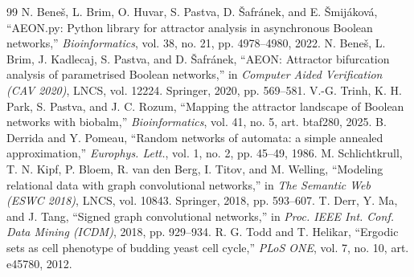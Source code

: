 \documentclass[journal]{IEEEtran}
\begin{document}
\begin{thebibliography}{99}
 N. Bene\v{s}, L. Brim, O. Huvar, S. Pastva, D. \v{S}afr\'{a}nek, and E.
\v{S}mij\'{a}kov\'{a}, ``AEON.py: Python library for attractor analysis in asynchronous
Boolean networks,'' \emph{Bioinformatics}, vol. 38, no. 21, pp. 4978--4980, 2022.
 N. Bene\v{s}, L. Brim, J. Kadlecaj, S. Pastva, and D. \v{S}afr\'{a}nek,
``AEON: Attractor bifurcation analysis of parametrised Boolean networks,'' in
\emph{Computer Aided Verification (CAV 2020)}, LNCS, vol. 12224. Springer, 2020, pp.
569--581.
 V.-G. Trinh, K. H. Park, S. Pastva, and J. C. Rozum, ``Mapping the
attractor landscape of Boolean networks with biobalm,'' \emph{Bioinformatics}, vol. 41,
no. 5, art. btaf280, 2025.
 B. Derrida and Y. Pomeau, ``Random networks of automata: a simple
annealed approximation,'' \emph{Europhys. Lett.}, vol. 1, no. 2, pp. 45--49, 1986.
 M. Schlichtkrull, T. N. Kipf, P. Bloem, R. van den Berg, I. Titov, and M.
Welling, ``Modeling relational data with graph convolutional networks,'' in \emph{The
Semantic Web (ESWC 2018)}, LNCS, vol. 10843. Springer, 2018, pp. 593--607.
 T. Derr, Y. Ma, and J. Tang, ``Signed graph convolutional networks,''
in \emph{Proc. IEEE Int. Conf. Data Mining (ICDM)}, 2018, pp. 929--934.
 R. G. Todd and T. Helikar, ``Ergodic sets as cell phenotype of budding
yeast cell cycle,'' \emph{PLoS ONE}, vol. 7, no. 10, art. e45780, 2012.
\end{thebibliography}
\end{document}
